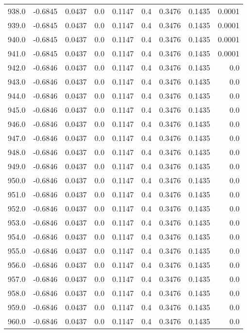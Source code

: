 \begin{longtable}{lrrrrrrrr}
938.0 & -0.6845 & 0.0437 & 0.0 & 0.1147 & 0.4 & 0.3476 & 0.1435 & 0.0001 \\
939.0 & -0.6845 & 0.0437 & 0.0 & 0.1147 & 0.4 & 0.3476 & 0.1435 & 0.0001 \\
940.0 & -0.6845 & 0.0437 & 0.0 & 0.1147 & 0.4 & 0.3476 & 0.1435 & 0.0001 \\
941.0 & -0.6845 & 0.0437 & 0.0 & 0.1147 & 0.4 & 0.3476 & 0.1435 & 0.0001 \\
942.0 & -0.6846 & 0.0437 & 0.0 & 0.1147 & 0.4 & 0.3476 & 0.1435 & 0.0 \\
943.0 & -0.6846 & 0.0437 & 0.0 & 0.1147 & 0.4 & 0.3476 & 0.1435 & 0.0 \\
944.0 & -0.6846 & 0.0437 & 0.0 & 0.1147 & 0.4 & 0.3476 & 0.1435 & 0.0 \\
945.0 & -0.6846 & 0.0437 & 0.0 & 0.1147 & 0.4 & 0.3476 & 0.1435 & 0.0 \\
946.0 & -0.6846 & 0.0437 & 0.0 & 0.1147 & 0.4 & 0.3476 & 0.1435 & 0.0 \\
947.0 & -0.6846 & 0.0437 & 0.0 & 0.1147 & 0.4 & 0.3476 & 0.1435 & 0.0 \\
948.0 & -0.6846 & 0.0437 & 0.0 & 0.1147 & 0.4 & 0.3476 & 0.1435 & 0.0 \\
949.0 & -0.6846 & 0.0437 & 0.0 & 0.1147 & 0.4 & 0.3476 & 0.1435 & 0.0 \\
950.0 & -0.6846 & 0.0437 & 0.0 & 0.1147 & 0.4 & 0.3476 & 0.1435 & 0.0 \\
951.0 & -0.6846 & 0.0437 & 0.0 & 0.1147 & 0.4 & 0.3476 & 0.1435 & 0.0 \\
952.0 & -0.6846 & 0.0437 & 0.0 & 0.1147 & 0.4 & 0.3476 & 0.1435 & 0.0 \\
953.0 & -0.6846 & 0.0437 & 0.0 & 0.1147 & 0.4 & 0.3476 & 0.1435 & 0.0 \\
954.0 & -0.6846 & 0.0437 & 0.0 & 0.1147 & 0.4 & 0.3476 & 0.1435 & 0.0 \\
955.0 & -0.6846 & 0.0437 & 0.0 & 0.1147 & 0.4 & 0.3476 & 0.1435 & 0.0 \\
956.0 & -0.6846 & 0.0437 & 0.0 & 0.1147 & 0.4 & 0.3476 & 0.1435 & 0.0 \\
957.0 & -0.6846 & 0.0437 & 0.0 & 0.1147 & 0.4 & 0.3476 & 0.1435 & 0.0 \\
958.0 & -0.6846 & 0.0437 & 0.0 & 0.1147 & 0.4 & 0.3476 & 0.1435 & 0.0 \\
959.0 & -0.6846 & 0.0437 & 0.0 & 0.1147 & 0.4 & 0.3476 & 0.1435 & 0.0 \\
960.0 & -0.6846 & 0.0437 & 0.0 & 0.1147 & 0.4 & 0.3476 & 0.1435 & 0.0 \\

\end{longtable}
